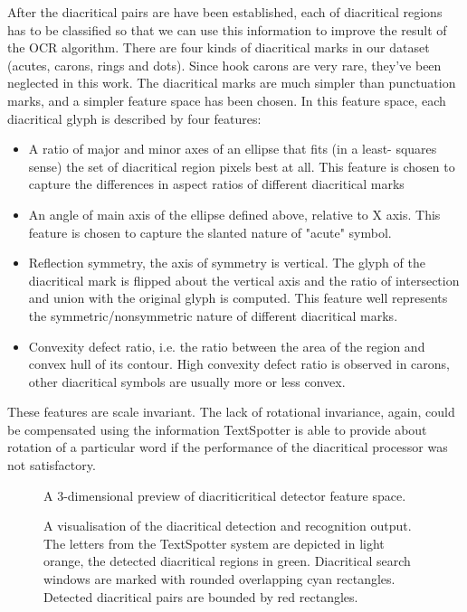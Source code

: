 \documentclass[12pt,a4paper]{report}
\begin{document}
After the diacritical pairs are have been established, each of diacritical regions has to be classified so that we can use this information to improve the result of the OCR algorithm. There are four kinds of diacritical marks in our dataset (acutes, carons, rings and dots). Since hook carons are very rare, they've been neglected in this work. The diacritical marks are much simpler than punctuation marks, and a simpler feature space has been chosen. In this feature space, each diacritical glyph is described by four features:
\begin{itemize}
    \item A ratio of major and minor axes of an ellipse that fits (in a least- squares sense) the set of diacritical region pixels best at all. This feature is chosen to capture the differences in aspect ratios of different diacritical marks
    \item An angle of main axis of the ellipse defined above, relative to X axis. This feature is chosen to capture the slanted nature of "acute" symbol.
    \item Reflection symmetry, the axis of symmetry is vertical. The glyph of the diacritical mark is flipped about the vertical axis and the ratio of intersection and union with the original glyph is computed. This feature well represents the symmetric/nonsymmetric nature of different diacritical marks.
    \item Convexity defect ratio, i.e. the ratio between the area of the region and convex hull of its contour. High convexity defect ratio is observed in carons, other diacritical symbols are usually more or less convex.
\end{itemize}
These features are scale invariant. The lack of rotational invariance, again, could be compensated using the information TextSpotter is able to provide about rotation of a particular word if the performance of the diacritical processor was not satisfactory.

\begin{figure}[htbp]
    \centering
    \caption{A 3-dimensional preview of diacriticritical detector feature space.}
    \label{fig:diacritic-detector-space}
\end{figure}

\begin{figure}[htbp]
    \centering
    \caption{A visualisation of the diacritical detection and recognition output. The letters from the TextSpotter system are depicted in light orange, the detected diacritical regions in green. Diacritical search windows are marked with rounded overlapping cyan rectangles. Detected diacritical pairs are bounded by red rectangles.}
    \label{fig:diacritic-output}
\end{figure}
\end{document}
